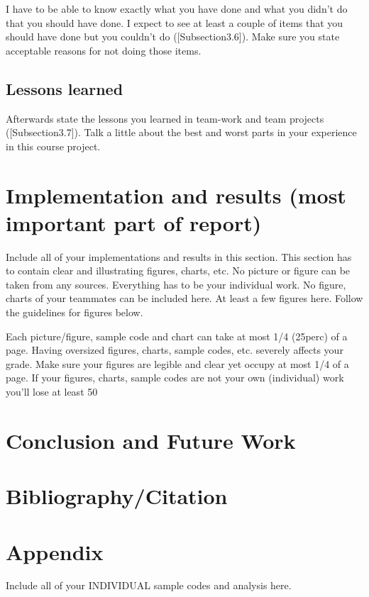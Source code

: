 \documentclass[12pt,a4paper]{report}
\begin{document}
	 I have to be
	 able to know exactly what you have done and what you didn't do that you should
	 have done. I expect to see at least a couple of items that you should have done
	 but you couldn't do ([Subsection3.6]). Make sure you state acceptable reasons for
	 not doing those items.
	 
	\section{Lessons learned}
	
	Afterwards state the
	lessons you learned in team-work and team projects ([Subsection3.7]). Talk a
	little about the best and worst parts in your experience in this course project.
	
\chapter{Implementation and results (most important part of report)}	
 Include all of your implementations and results in this section.
 This section has to contain clear and illustrating figures, charts, etc. No
 picture or figure can be taken from any sources. Everything has to be your 
 individual work. No figure, charts of your teammates can be included here.
 At least a few figures here. Follow the guidelines for figures below.
 
 Each picture/figure, sample code and chart can take at most 1/4 (25perc) of a page.
 Having oversized figures, charts, sample codes, etc. severely affects your grade.
 Make sure your figures are legible and clear yet occupy at most 1/4 of a page. If
 your figures, charts, sample codes are not your own (individual) work you'll lose
 at least 50%
\chapter{Conclusion and Future Work}
\chapter{Bibliography/Citation}
\chapter{Appendix} 
Include all of your INDIVIDUAL sample codes and
analysis here.
	
\end{document}
